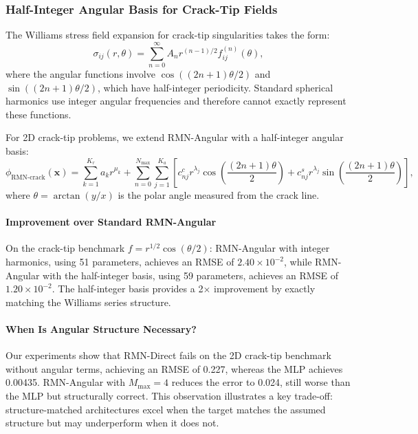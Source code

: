 \documentclass[twoside,11pt]{article}
\newcommand{\bx}{\bm{x}}
\begin{document}
\subsubsection{Half-Integer Angular Basis for Crack-Tip Fields}
\label{subsubsec:half_integer}

The Williams stress field expansion \citep{williams1957stress} for crack-tip singularities takes the form:
\begin{equation}
	\sigma_{ij}(r, \theta) = \sum_{n=0}^\infty A_n r^{(n-1)/2} f_{ij}^{(n)}(\theta),
\end{equation}
where the angular functions involve $\cos((2n+1)\theta/2)$ and $\sin((2n+1)\theta/2)$, which have half-integer periodicity. Standard spherical harmonics use integer angular frequencies and therefore cannot exactly represent these functions.

\begin{definition}
	For 2D crack-tip problems, we extend RMN-Angular with a half-integer angular basis:
	\begin{equation}
		\phi_{\text{RMN-crack}}(\bx) = \sum_{k=1}^{K_r} a_k r^{\mu_k} + \sum_{n=0}^{N_{\max}} \sum_{j=1}^{K_a} \left[ c_{nj}^c r^{\lambda_j} \cos\left(\frac{(2n+1)\theta}{2}\right) + c_{nj}^s r^{\lambda_j} \sin\left(\frac{(2n+1)\theta}{2}\right) \right],
		\label{eq:rmn_crack}
	\end{equation}
	where $\theta = \arctan(y/x)$ is the polar angle measured from the crack line.
\end{definition}

\paragraph{Improvement over Standard RMN-Angular} On the crack-tip benchmark $f = r^{1/2}\cos(\theta/2)$: RMN-Angular with integer harmonics, using 51 parameters, achieves an RMSE of $2.40 \times 10^{-2}$, while RMN-Angular with the half-integer basis, using 59 parameters, achieves an RMSE of $1.20 \times 10^{-2}$. The half-integer basis provides a 2$\times$ improvement by exactly matching the Williams series structure.

\paragraph{When Is Angular Structure Necessary?} Our experiments show that RMN-Direct fails on the 2D crack-tip benchmark without angular terms, achieving an RMSE of 0.227, whereas the MLP achieves 0.00435. RMN-Angular with $M_{\max} = 4$ reduces the error to 0.024, still worse than the MLP but structurally correct. This observation illustrates a key trade-off: structure-matched architectures excel when the target matches the assumed structure but may underperform when it does not.
\end{document}
